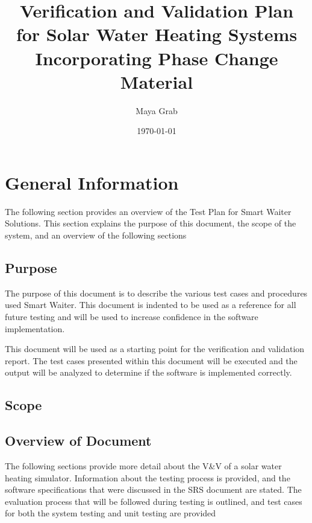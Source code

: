 \documentclass[12pt]{article}
\begin{document}
\title{Verification and Validation Plan for Solar Water Heating Systems Incorporating 
Phase Change Material} 
\author{Maya Grab}
\date{\today}
	
\maketitle

\tableofcontents

%
%

\section{General Information}
The following section provides an overview of the Test Plan 
for Smart Waiter Solutions.
 This section explains the purpose of this document, the scope of the system, and an overview of the following sections

\subsection{Purpose}
The purpose of this document is to describe the various test cases and procedures used  Smart Waiter.
This document is indented to be used as a reference for all future testing and will
be used to increase confidence in the software implementation.  

This document will be used as a starting point for the verification and validation report. The 
test cases presented within this document will be executed and the output will be analyzed to 
determine if the software is implemented correctly.  


\subsection{Scope}



\subsection{Overview of Document }
The following sections provide more detail about the V\&V of a solar water heating
 simulator. Information about the testing process is provided, and the software specifications
that were discussed in the SRS document are stated.  The evaluation process that will be followed during 
testing is outlined, and test cases for both the system testing and unit testing are provided 
\end{document}
